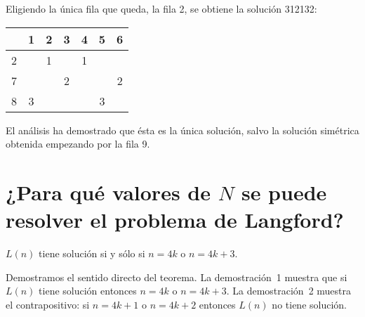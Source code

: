 Eligiendo la única fila que queda, la fila 2, se obtiene la solución 3{}1{}2{}1{}3{}2:
\begin{center}
\addtolength{\tabcolsep}{4pt}
\begin{tabular}{|c||c|c|c|c|c|c|}
\hline
&1&2&3&4&5&6\\\hline\hline
2&&1&&1&&\\\hline
7&&&2&&&2\\\hline
8&3&&&&3&\\\hline
\end{tabular}
\end{center}
El análisis ha demostrado que ésta es la única solución, salvo la solución simétrica obtenida empezando por la fila 9.

\section{¿Para qué valores de $N$ se puede resolver el problema de Langford?}\label{s.langford-theorem}

\begin{theorem} \label{thm.langford}
$L(n)$ tiene solución si y sólo si $n=4k$ o $n=4k+3$.
\end{theorem}

Demostramos el sentido directo del teorema. La demostración~1 muestra que si $L(n)$ tiene solución entonces $n=4k$ o $n=4k+3$. La demostración~2 muestra el contrapositivo: si $n=4k+1$ o $n=4k+2$ entonces $L(n)$ no tiene solución.

